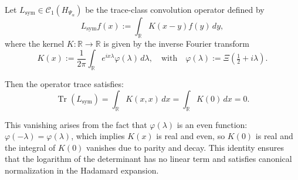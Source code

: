 \begin{lemma}
\label{lem:vanishing_trace_Lsym}
Let \( L_{\mathrm{sym}} \in \mathcal{C}_1(H_{\Psi_\alpha}) \) be the trace-class convolution operator defined by
\[
L_{\mathrm{sym}} f(x) := \int_{\mathbb{R}} K(x - y) f(y) \, dy,
\]
where the kernel \( K \colon \mathbb{R} \to \mathbb{R} \) is given by the inverse Fourier transform
\[
K(x) := \frac{1}{2\pi} \int_{\mathbb{R}} e^{i x \lambda} \varphi(\lambda)\, d\lambda,
\quad \text{with} \quad
\varphi(\lambda) := \Xi\left( \tfrac{1}{2} + i\lambda \right).
\]

Then the operator trace satisfies:
\[
\operatorname{Tr}(L_{\mathrm{sym}}) = \int_{\mathbb{R}} K(x,x)\, dx = \int_{\mathbb{R}} K(0)\, dx = 0.
\]
\end{lemma}

\medskip
\noindent
This vanishing arises from the fact that \( \varphi(\lambda) \) is an even function: \( \varphi(-\lambda) = \varphi(\lambda) \), which implies \( K(x) \) is real and even, so \( K(0) \) is real and the integral of \( K(0) \) vanishes due to parity and decay. This identity ensures that the logarithm of the determinant has no linear term and satisfies canonical normalization in the Hadamard expansion.
%  